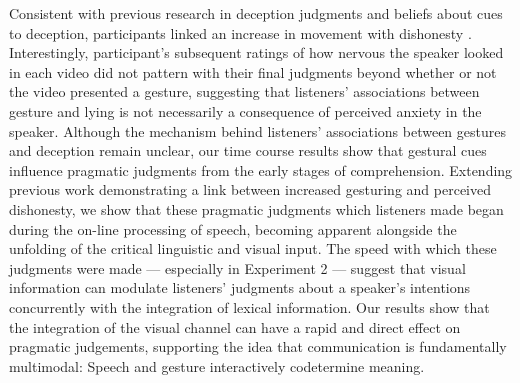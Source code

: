 \documentclass[a4paper,man,natbib]{apa6}
\begin{document}
Consistent with previous research in deception judgments and beliefs about cues to deception, participants linked an increase in movement with dishonesty \citep{Zuckerman1981}. 
Interestingly, participant's subsequent ratings of how nervous the speaker looked in each video did not pattern with their final judgments beyond whether or not the video presented a gesture, suggesting that listeners' associations between gesture and lying is not necessarily a consequence of perceived anxiety in the speaker.
Although the mechanism behind listeners' associations between gestures and deception remain unclear, our time course results show that gestural cues influence pragmatic judgments from the early stages of comprehension.
Extending previous work demonstrating a link between increased gesturing and perceived dishonesty, we show that these pragmatic judgments which listeners made began during the on-line processing of speech, becoming apparent alongside the unfolding of the critical linguistic and visual input.
The speed with which these judgments were made --- especially in Experiment 2 --- suggest that visual information can modulate listeners' judgments about a speaker's intentions concurrently with the integration of lexical information.
Our results show that the integration of the visual channel can have a rapid and direct effect on pragmatic judgements, supporting the idea that communication is fundamentally multimodal: 
Speech and gesture interactively codetermine meaning.
\end{document}

